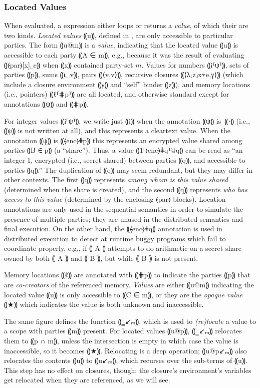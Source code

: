 \subsubsection{Located Values}
\label{subsubsec:mpc-design-seq-val}

When evaluated, a \mpc expression either loops or returns a \emph{value},
of which their are two kinds. \emph{Located values} ⸨u⸩, defined in
, are only accessible to particular parties. The form
⸨u@m⸩ is a \emph{value}, indicating that the located value ⸨u⸩ is
accessible to each party ⸨A ∈ m⸩, e.g., because it was the result of
evaluating ⸨⦑par⦒[x]␣e⸩ when ⸨x⸩ contained party-set $m$. Values for numbers ⸨i⸢ψ⸣⸩, sets of parties
⸨p⸩, sums ⸨ιᵢ␣v⸩, pairs ⸨⟨v,v⟩⸩, recursive closures ⸨⟨λ⸤z⸥x⍪e,γ⟩⸩ (which include
a closure environment ⸨γ⸩ and “self” binder ⸨z⸩), and memory locations (i.e.,
pointers) ⸨ℓ⸢⋕p⸣⸩ are all located, and otherwise standard except for annotations
⸨ψ⸩ and ⸨⋕p⸩.

For integer values ⸨i⸢ψ⸣⸩, we write just ⸨i⸩ when the annotation ⸨ψ⸩ is~⸨⋅⸩
(i.e., ⸨ψ⸩ is not written at all), and this represents a cleartext value. When
the annotation ⸨ψ⸩ is ⸨⦑enc⦒⋕p⸩ this represents an encrypted value shared among
parties ⸨B ∈ p⸩ (a ``share''). Thus, a value ⸨1⸢⦑enc⦒⋕q⸣@q⸩ can be read as “an
integer 1, encrypted (i.e., secret shared) between parties ⸨q⸩, and accessible to parties
⸨q⸩.” The duplication of ⸨q⸩ may seem redundant, but they may differ
in other contexts. The first ⸨q⸩ represents \emph{among whom is this value shared}
(determined when the share is created), and the second ⸨q⸩ represents
\emph{who has access to this value} (determined by the enclosing ⦑par⦒ blocks).
Location annotations are only used in the sequential semantics in order to
simulate the presence of multiple parties; they are unused in the distributed
semantics and final execution. On the other hand, the ⸨⦑enc⦒⋕q⸩ annotation is
used in distributed execution to detect at runtime buggy programs which fail to
coordinate properly, e.g., if ⸨ A ⸩ attempts to do arithmetic on a secret share
owned by both ⸨ A ⸩ and ⸨ B ⸩, but while ⸨ B ⸩ is not present.

Memory locations ⸨ℓ⸩ are annotated with ⸨⋕p⸩ to indicate the parties
⸨p⸩ that are \emph{co-creators} of the referenced memory. \emph{Values}
are either ⸨u@m⸩ indicating the located value ⸨u⸩ is only accessible to ⸨C ∈ m⸩,
or they are the \emph{opaque value} ⸨★⸩ which indicates the value is both
unknown and inaccessible.

The same figure defines the function ⸨‗↙ₘ⸩, which is used to \emph{(re)locate} a
value to a scope with parties ⸨m⸩ present. For located values ⸨u@p⸩, ⸨‗↙ₘ⸩
relocates them to ⸨p ∩ m⸩, unless the intersection is empty in which case the
value is inaccessible, so it becomes ⸨★⸩. Relocating is a deep operation;
⸨u@p↙ₘ⸩ also relocates the contents ⸨u⸩ to ⸨u↙ₘ⸩, which recurses over
the sub-terms of ⸨u⸩. This step has no effect on closures, though: the closure's
environment's variables get relocated when they are referenced, as we will see.

